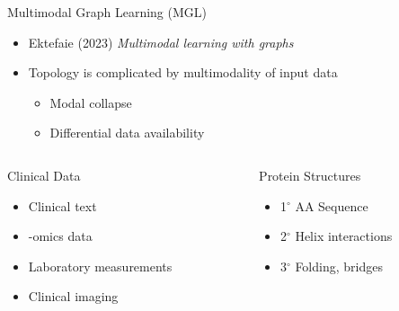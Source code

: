\documentclass{beamer}
\begin{document}
\begin{frame}{Multimodal Graph Learning (MGL)}
\begin{itemize}\setlength\itemsep{6mm}
    \item Ektefaie (2023) {\it Multimodal learning with graphs} \cite{ektefaie_multimodal_2023}
    \item Topology is complicated by multimodality of input data 
    \begin{itemize}
        \item Modal collapse \cite{javaloy_mitigating_2022}
        \item Differential data availability 
    \end{itemize}
\end{itemize}    
\vspace{3mm}
    \begin{columns}[T]
        \begin{column}{0.5\textwidth}
            Clinical Data
            \begin{itemize}        
                \item Clinical text  
                \item -omics data 
                \item Laboratory measurements 
                \item Clinical imaging
            \end{itemize}
            \end{column}
        \begin{column}{0.5\textwidth}
            Protein Structures
            \begin{itemize}        
                \item 1$^\circ$ AA Sequence
                \item 2$^\circ$ Helix interactions
                \item 3$^\circ$ Folding, bridges 
            \end{itemize}
        \end{column}
    \end{columns}
\end{frame}
\end{document}
